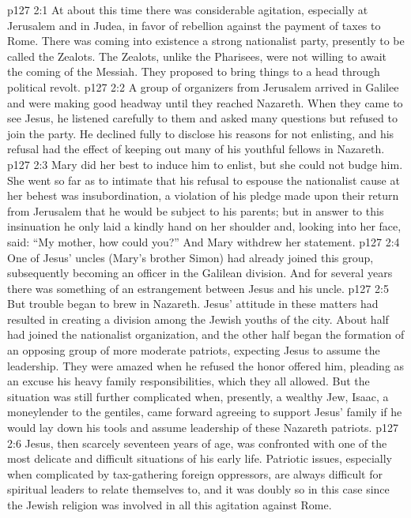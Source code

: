 \vs p127 2:1 At about this time there was considerable agitation, especially at Jerusalem and in Judea, in favor of rebellion against the payment of taxes to Rome. There was coming into existence a strong nationalist party, presently to be called the Zealots. The Zealots, unlike the Pharisees, were not willing to await the coming of the Messiah. They proposed to bring things to a head through political revolt.
\vs p127 2:2 A group of organizers from Jerusalem arrived in Galilee and were making good headway until they reached Nazareth. When they came to see Jesus, he listened carefully to them and asked many questions but refused to join the party. He declined fully to disclose his reasons for not enlisting, and his refusal had the effect of keeping out many of his youthful fellows in Nazareth.
\vs p127 2:3 Mary did her best to induce him to enlist, but she could not budge him. She went so far as to intimate that his refusal to espouse the nationalist cause at her behest was insubordination, a violation of his pledge made upon their return from Jerusalem that he would be subject to his parents; but in answer to this insinuation he only laid a kindly hand on her shoulder and, looking into her face, said: \textcolor{ubdarkred}{“My mother, how could you?”} And Mary withdrew her statement.
\vs p127 2:4 One of Jesus’ uncles (Mary’s brother Simon) had already joined this group, subsequently becoming an officer in the Galilean division. And for several years there was something of an estrangement between Jesus and his uncle.
\vs p127 2:5 But trouble began to brew in Nazareth. Jesus’ attitude in these matters had resulted in creating a division among the Jewish youths of the city. About half had joined the nationalist organization, and the other half began the formation of an opposing group of more moderate patriots, expecting Jesus to assume the leadership. They were amazed when he refused the honor offered him, pleading as an excuse his heavy family responsibilities, which they all allowed. But the situation was still further complicated when, presently, a wealthy Jew, Isaac, a moneylender to the gentiles, came forward agreeing to support Jesus’ family if he would lay down his tools and assume leadership of these Nazareth patriots.
\vs p127 2:6 Jesus, then scarcely seventeen years of age, was confronted with one of the most delicate and difficult situations of his early life. Patriotic issues, especially when complicated by tax\hyp{}gathering foreign oppressors, are always difficult for spiritual leaders to relate themselves to, and it was doubly so in this case since the Jewish religion was involved in all this agitation against Rome.
